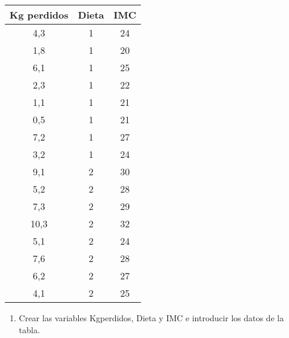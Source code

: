 \begin{enumerate}
\begin{center}
\begin{tabular}{|l|l|l|}
\hline
\multicolumn{1}{|c|}{Kg perdidos} & \multicolumn{1}{c|}{Dieta} & \multicolumn{1}{c|}{IMC} \\
\hline
\multicolumn{1}{|c|}{4,3} & \multicolumn{1}{c|}{1} & \multicolumn{1}{c|}{24} \\
\hline
\multicolumn{1}{|c|}{1,8} & \multicolumn{1}{c|}{1} & \multicolumn{1}{c|}{20} \\
\hline
\multicolumn{1}{|c|}{6,1} & \multicolumn{1}{c|}{1} & \multicolumn{1}{c|}{25} \\
\hline
\multicolumn{1}{|c|}{2,3} & \multicolumn{1}{c|}{1} & \multicolumn{1}{c|}{22} \\
\hline
\multicolumn{1}{|c|}{1,1} & \multicolumn{1}{c|}{1} & \multicolumn{1}{c|}{21} \\
\hline
\multicolumn{1}{|c|}{0,5} & \multicolumn{1}{c|}{1} & \multicolumn{1}{c|}{21} \\
\hline
\multicolumn{1}{|c|}{7,2} & \multicolumn{1}{c|}{1} & \multicolumn{1}{c|}{27} \\
\hline
\multicolumn{1}{|c|}{3,2} & \multicolumn{1}{c|}{1} & \multicolumn{1}{c|}{24} \\
\hline
\multicolumn{1}{|c|}{9,1} & \multicolumn{1}{c|}{2} & \multicolumn{1}{c|}{30} \\
\hline
\multicolumn{1}{|c|}{5,2} & \multicolumn{1}{c|}{2} & \multicolumn{1}{c|}{28} \\
\hline
\multicolumn{1}{|c|}{7,3} & \multicolumn{1}{c|}{2} & \multicolumn{1}{c|}{29} \\
\hline
\multicolumn{1}{|c|}{10,3} & \multicolumn{1}{c|}{2} & \multicolumn{1}{c|}{32} \\
\hline
\multicolumn{1}{|c|}{5,1} & \multicolumn{1}{c|}{2} & \multicolumn{1}{c|}{24} \\
\hline
\multicolumn{1}{|c|}{7,6} & \multicolumn{1}{c|}{2} & \multicolumn{1}{c|}{28} \\
\hline
\multicolumn{1}{|c|}{6,2} & \multicolumn{1}{c|}{2} & \multicolumn{1}{c|}{27} \\
\hline
\multicolumn{1}{|c|}{4,1} & \multicolumn{1}{c|}{2} & \multicolumn{1}{c|}{25} \\
\hline
\end{tabular}

\end{center}

\begin{enumerate}

\item Crear las variables Kgperdidos, Dieta y IMC e introducir los datos de la tabla.



\end{enumerate}
\end{enumerate}
